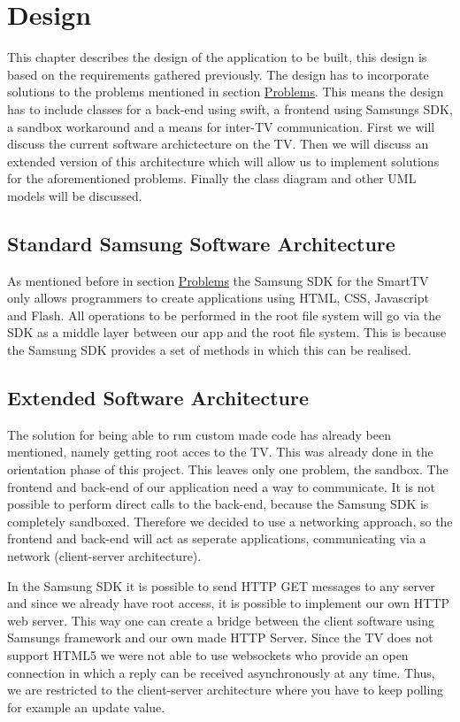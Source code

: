 \chapter{Design}
This chapter describes the design of the application to be built, this design is based on the requirements gathered previously. The design has to
incorporate solutions to the problems mentioned in section \hyperref[sec:problems]{Problems}.
This means the design has to include classes for a back-end using swift, a frontend using Samsung\textquotesingle s SDK, a sandbox workaround and a
 means for inter-TV communication. First we will discuss the current software archictecture on the TV. Then we will discuss an extended version of
 this architecture which will allow us to implement solutions for the aforementioned problems. Finally the class diagram and other UML models will be discussed.

\section{Standard Samsung Software Architecture}
As mentioned before in section \hyperref[sec:problems]{Problems}
the Samsung SDK for the SmartTV only allows programmers to create applications using HTML, CSS, Javascript and Flash.
All operations to be performed in the root file system will go via the SDK as a middle layer between our app and the root file system. This is
because the Samsung SDK provides a set of methods in which this can be realised.

\section{Extended Software Architecture}
The solution for being able to run custom made code has already been mentioned, namely getting root acces to the TV.
This was already done in the orientation phase of this project. This leaves only one problem, the sandbox.
The frontend and back-end of our application need a way to communicate. It is not possible to perform direct calls to the back-end, because the 
Samsung SDK is completely sandboxed. Therefore we decided to use a networking approach, so the frontend and back-end will act as seperate 
applications, communicating via a network (client-server architecture).

In the Samsung SDK it is possible to send HTTP GET messages to any server and since we already have root access, it is possible to implement
our own HTTP web server. This way one can create a bridge between the client software using Samsung\textquotesingle s framework and our own made 
HTTP Server. Since the TV does not support HTML5 we were not able to use websockets who provide an open connection in which a reply can be 
received asynchronously at any time. Thus, we are restricted to the client-server architecture where you have to keep polling for example an 
update value.


